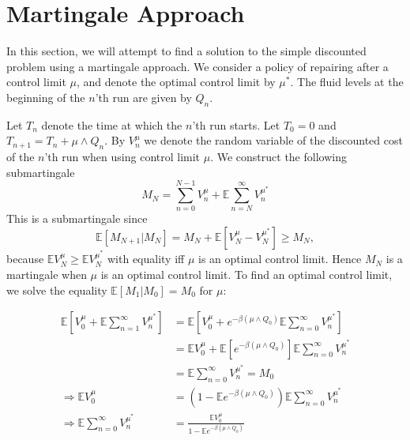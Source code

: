 


\chapter{Martingale Approach}
In this section, we will attempt to find a solution to the simple discounted problem using a martingale approach.
We consider a policy of repairing after a control limit $\mu$, and denote the optimal control limit by $\mu^*$.
The fluid levels at the beginning of the $n$'th run are given by $Q_n$.

Let $T_n$ denote the time at which the $n$'th run starts.
Let $T_0=0$ and $T_{n+1}=T_n+\mu\wedge Q_n$.
By $V_n^\mu$ we denote the random variable of the discounted cost of the $n$'th run when using control limit $\mu$.
We construct the following submartingale
$$
M_N=\sum\limits_{n=0}^{N-1}V_n^\mu+\mathbb{E}\sum\limits_{n=N}^\infty V_n^{\mu^*}
$$
This is a submartingale since
$$
\mathbb{E}[M_{N+1}|M_N]=M_N+\mathbb{E}[V_N^\mu-V_N^{\mu^*}]\geq M_N,
$$
because $\mathbb{E}V_N^\mu\geq \mathbb{E}V_N^{\mu^*}$ with equality iff $\mu$ is an optimal control limit.
Hence $M_N$ is a martingale when $\mu$ is an optimal control limit.
To find an optimal control limit, we solve the equality $\mathbb{E}[M_{1}|M_0]=M_0$ for $\mu$:

\begin{equation}\begin{split}
\mathbb{E}[V_0^\mu+\mathbb{E}\sum\limits_{n=1}^\infty V_n^{\mu^*}]
&=\mathbb{E}[V_0^\mu+e^{-\beta(\mu\wedge Q_0)}\mathbb{E}\sum\limits_{n=0}^\infty V_n^{\mu^*}]\\
&=\mathbb{E}V_0^\mu+\mathbb{E}[e^{-\beta(\mu\wedge Q_0)}]\mathbb{E}\sum\limits_{n=0}^\infty V_n^{\mu^*}\\
&=\mathbb{E}\sum\limits_{n=0}^\infty V_n^{\mu^*}=M_0\\
\Rightarrow \mathbb{E}V_0^\mu&=(1-\mathbb{E}e^{-\beta(\mu\wedge Q_0)})\mathbb{E}\sum\limits_{n=0}^\infty V_n^{\mu^*}\\
\Rightarrow \mathbb{E}\sum\limits_{n=0}^\infty V_n^{\mu^*}&=\frac{\mathbb{E}V_0^\mu}{1-\mathbb{E}e^{-\beta(\mu\wedge Q_0)}}
\end{split}
\end{equation}



